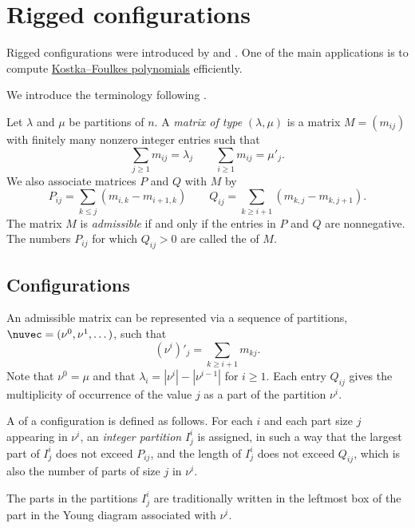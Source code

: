 


\section[riggedConfigurations]{Rigged configurations}

Rigged configurations were introduced by  and
 \cite{KirillovReshetikhin1988thebethe}.
One of the main applications is to compute
\hyperref[kostkaFoulkes]{Kostka--Foulkes polynomials} efficiently.

We introduce the terminology following
\cite{DesarmenienLeclercThibon1994}.

Let $\lambda$ and $\mu$ be partitions of $n$.  A \emph{matrix of type}
$(\lambda,\mu)$ is a matrix $M=(m_{ij})$ with finitely many nonzero integer
entries such that
 \[
 \sum_{j\geq 1} m_{ij} = \lambda_j \qquad \sum_{i\geq 1} m_{ij} = \mu'_j.
 \]
We also associate matrices $P$ and $Q$ with $M$ by
 \[
  P_{ij} = \sum_{k \leq j } \left( m_{i,k} - m_{i+1,k} \right) \qquad
  Q_{ij} = \sum_{k \geq i+1 } \left( m_{k,j} - m_{k,j+1} \right).
 \]
The matrix $M$ is \emph{admissible} if and only if the entries in $P$ and $Q$
are nonnegative.
The numbers $P_{ij}$ for which $Q_{ij}\gt 0$ are called the
 of $M$.

\subsection[configurations]{Configurations}

An admissible matrix can be represented via a sequence of partitions,
$\nuvec = (\nu^0,\nu^1,\dotsc)$, such that
 \[
 (\nu^i)'_j = \sum_{k \geq i+1} m_{kj}.
 \]
Note that $\nu^0 = \mu$ and that $\lambda_i = |\nu^i|-|\nu^{i-1}|$ for
$i \geq 1$.
Each entry $Q_{ij}$ gives the multiplicity of occurrence of the value $j$ as a
part of the partition $\nu^i$.


A  of a configuration is defined as follows.
For each $i$ and each part size $j$ appearing in $\nu^i$,
an \emph{integer partition} $I^i_j$ is assigned,
in such a way that the largest part of $I^i_j$ does not exceed $P_{ij}$,
and the length of $I^i_j$ does not exceed $Q_{ij}$,
which is also the number of parts of size $j$ in $\nu^i$.

The parts in the partitions $I^i_j$ are traditionally written in the
leftmost box of the part in the Young diagram associated with $\nu^i$.

